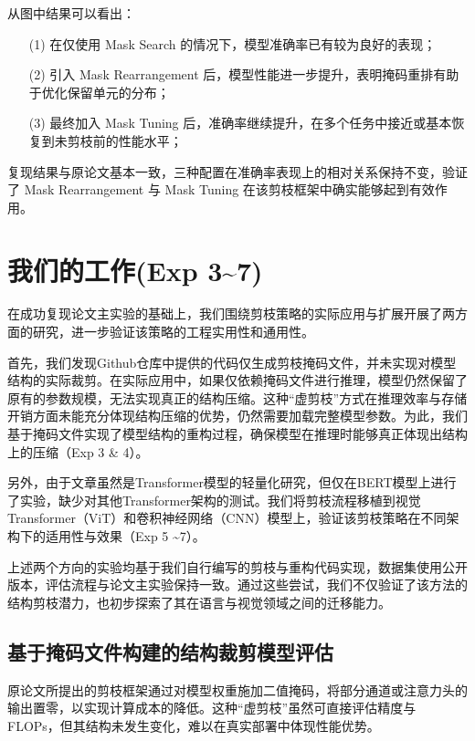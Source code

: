 \documentclass[UTF8,openany]{ctexbook}
\begin{document}
从图中结果可以看出：

\begin{enumerate}[itemsep=0pt, topsep=0pt, parsep=0pt, partopsep=0pt]
    \item[(1)] 在仅使用 Mask Search 的情况下，模型准确率已有较为良好的表现；
    \item[(2)] 引入 Mask Rearrangement 后，模型性能进一步提升，表明掩码重排有助于优化保留单元的分布；
    \item[(3)] 最终加入 Mask Tuning 后，准确率继续提升，在多个任务中接近或基本恢复到未剪枝前的性能水平；
\end{enumerate}

复现结果与原论文基本一致，三种配置在准确率表现上的相对关系保持不变，验证了 Mask Rearrangement 与 Mask Tuning 在该剪枝框架中确实能够起到有效作用。

\section{我们的工作(Exp 3\textasciitilde 7)}

在成功复现论文主实验的基础上，我们围绕剪枝策略的实际应用与扩展开展了两方面的研究，进一步验证该策略的工程实用性和通用性。

首先，我们发现Github仓库中提供的代码仅生成剪枝掩码文件，并未实现对模型结构的实际裁剪。在实际应用中，如果仅依赖掩码文件进行推理，模型仍然保留了原有的参数规模，无法实现真正的结构压缩。这种“虚剪枝”方式在推理效率与存储开销方面未能充分体现结构压缩的优势，仍然需要加载完整模型参数。为此，我们基于掩码文件实现了模型结构的重构过程，确保模型在推理时能够真正体现出结构上的压缩（Exp 3 \& 4）。

另外，由于文章虽然是Transformer模型的轻量化研究，但仅在BERT模型上进行了实验，缺少对其他Transformer架构的测试。我们将剪枝流程移植到视觉Transformer\cite{dosovitskiy2020image}（ViT）和卷积神经网络\cite{fukushima1980neocognitron}（CNN）模型上，验证该剪枝策略在不同架构下的适用性与效果（Exp 5  \textasciitilde 7）。

上述两个方向的实验均基于我们自行编写的剪枝与重构代码实现，数据集使用公开版本，评估流程与论文主实验保持一致。通过这些尝试，我们不仅验证了该方法的结构剪枝潜力，也初步探索了其在语言与视觉领域之间的迁移能力。

\subsection{基于掩码文件构建的结构裁剪模型评估}

原论文所提出的剪枝框架通过对模型权重施加二值掩码，将部分通道或注意力头的输出置零，以实现计算成本的降低。这种“虚剪枝”虽然可直接评估精度与 FLOPs，但其结构未发生变化，难以在真实部署中体现性能优势。
\end{document}
